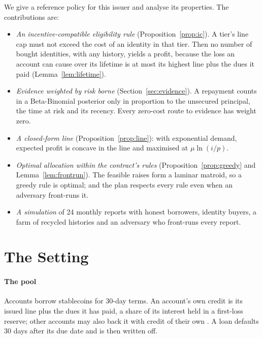 \documentclass[preprint,11pt,authoryear]{elsarticle}
\begin{document}
We give a reference policy for this issuer and analyse its properties. The contributions are:
\begin{itemize}
\item \emph{An incentive-compatible eligibility rule} (Proposition~\ref{prop:ic}). A tier's line
  cap must not exceed the cost of an identity in that tier. Then no number of bought identities,
  with any history, yields a profit, because the loss an account can cause over its lifetime is at
  most its highest line plus the dues it paid (Lemma~\ref{lem:lifetime}).
\item \emph{Evidence weighted by risk borne} (Section~\ref{sec:evidence}). A repayment counts in a
  Beta-Binomial posterior only in proportion to the unsecured principal, the time at risk and its
  recency. Every zero-cost route to evidence has weight zero.
\item \emph{A closed-form line} (Proposition~\ref{prop:line}): with exponential demand, expected
  profit is concave in the line and maximised at $\mu\ln(i/p)$.
\item \emph{Optimal allocation within the contract's rules} (Proposition~\ref{prop:greedy} and
  Lemma~\ref{lem:frontrun}). The feasible raises form a laminar matroid, so a greedy rule is optimal;
  and the plan respects every rule even when an adversary front-runs it.
\item \emph{A simulation} of 24 monthly reports with honest borrowers, identity buyers, a farm of
  recycled histories and an adversary who front-runs every report.
\end{itemize}

\section{The Setting}\label{sec:setting}

\paragraph{The pool} Accounts borrow stablecoins for 30-day terms. An account's own credit is its
issued line plus the dues it has paid, a share of its interest held in a first-loss reserve; other
accounts may also back it with credit of their own \citep{conservedcredit2026}. A loan defaults 30
days after its due date and is then written off.
\end{document}
